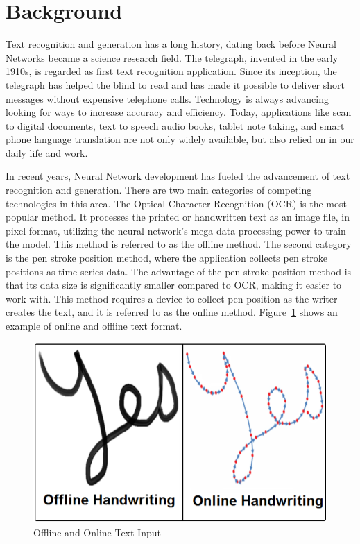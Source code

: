 \documentclass{article}
\begin{document}
\section{Background}
Text recognition and generation has a long history, dating back before Neural Networks became a science research field. The telegraph, invented in the early 1910s, is regarded as first text recognition application. Since its inception, the telegraph has helped the blind to read and has made it possible to deliver short messages without expensive telephone calls\cite{previous-work-33}. Technology is always advancing looking for ways to increase accuracy and efficiency. Today, applications like scan to digital documents, text to speech audio books, tablet note taking, and smart phone language translation are not only widely available, but also relied on in our daily life and work\cite{previous-work-24}. 

In recent years, Neural Network development has fueled the advancement of text recognition and generation. There are two main categories of competing technologies in this area. The Optical Character Recognition (OCR) is the most popular method. It processes the printed or handwritten text as an image file, in pixel format, utilizing the neural network's mega data processing power to train the model. This method is referred to as the offline method\cite{previous-work-23}. The second category is the pen stroke position method, where the application collects pen stroke positions as time series data. The advantage of the pen stroke position method is that its data size is significantly smaller compared to OCR, making it easier to work with. This method requires a device to collect pen position as the writer creates the text, and it is referred to as the online method. Figure~\ref{fig:YES} shows an example of online and offline text format.  

    \begin{figure}[hbt!]
        \includegraphics[width=12cm]{Capture.PNG}
        \centering
        \caption{Offline and Online Text Input\cite{Yes_online_offline_graph}}
        \label{fig:YES}
    \end{figure}
\end{document}
